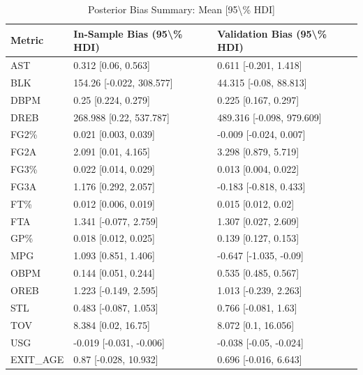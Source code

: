\begin{table}[t]
\caption*{
{\fontsize{20}{25}\selectfont  Posterior Bias Summary: Mean [95\textbackslash{}\% HDI]\fontsize{12}{15}\selectfont }
} 
\fontsize{12.0pt}{14.0pt}\selectfont
\begin{tabular*}{\linewidth}{@{\extracolsep{\fill}}lll}
\toprule
Metric & In-Sample Bias (95\textbackslash{}\% HDI) & Validation Bias (95\textbackslash{}\% HDI) \\ 
\midrule\addlinespace[2.5pt]
AST & 0.312 [0.06, 0.563] & 0.611 [-0.201, 1.418] \\ 
BLK & 154.26 [-0.022, 308.577] & 44.315 [-0.08, 88.813] \\ 
DBPM & 0.25 [0.224, 0.279] & 0.225 [0.167, 0.297] \\ 
DREB & 268.988 [0.22, 537.787] & 489.316 [-0.098, 979.609] \\ 
FG2\% & 0.021 [0.003, 0.039] & -0.009 [-0.024, 0.007] \\ 
FG2A & 2.091 [0.01, 4.165] & 3.298 [0.879, 5.719] \\ 
FG3\% & 0.022 [0.014, 0.029] & 0.013 [0.004, 0.022] \\ 
FG3A & 1.176 [0.292, 2.057] & -0.183 [-0.818, 0.433] \\ 
FT\% & 0.012 [0.006, 0.019] & 0.015 [0.012, 0.02] \\ 
FTA & 1.341 [-0.077, 2.759] & 1.307 [0.027, 2.609] \\ 
GP\% & 0.018 [0.012, 0.025] & 0.139 [0.127, 0.153] \\ 
MPG & 1.093 [0.851, 1.406] & -0.647 [-1.035, -0.09] \\ 
OBPM & 0.144 [0.051, 0.244] & 0.535 [0.485, 0.567] \\ 
OREB & 1.223 [-0.149, 2.595] & 1.013 [-0.239, 2.263] \\ 
STL & 0.483 [-0.087, 1.053] & 0.766 [-0.081, 1.63] \\ 
TOV & 8.384 [0.02, 16.75] & 8.072 [0.1, 16.056] \\ 
USG & -0.019 [-0.031, -0.006] & -0.038 [-0.05, -0.024] \\ 
EXIT\_AGE & 0.87 [-0.028, 10.932] & 0.696 [-0.016, 6.643] \\ 
\bottomrule
\end{tabular*}
\end{table}

